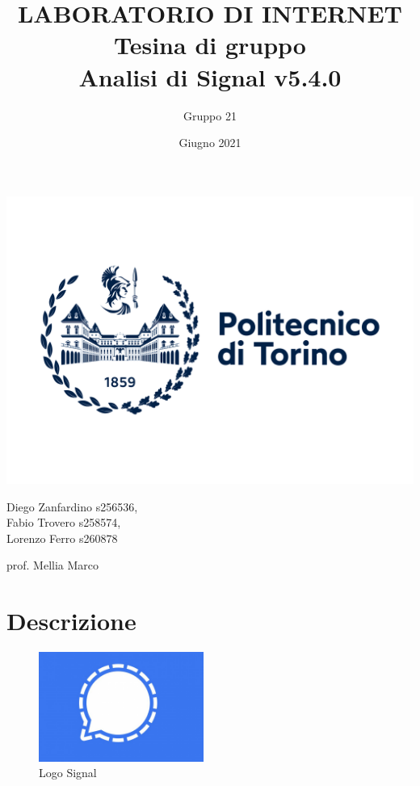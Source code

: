 \documentclass{article}
\title{\Huge LABORATORIO DI INTERNET 
    \\ Tesina di gruppo \\Analisi di Signal v5.4.0}
\author{Gruppo 21}
\date{Giugno 2021}
\begin{document}
    \maketitle

    \begin{center}
        \includegraphics[scale=0.1]{polito_logo_2021_blu.jpg}

        \vspace{20mm}

        Diego Zanfardino s256536, \\
        Fabio Trovero s258574, \\
        Lorenzo Ferro s260878

        \vspace{10mm}
        prof. Mellia Marco
    \end{center}

    \pagebreak


    \section{Descrizione}
    
    \begin{figure}
        \begin{center}
            \vspace{-20pt}
          \includegraphics[width=0.48\textwidth]{signal.jpg}
        \end{center}
        \vspace{-15pt}
        \caption{Logo Signal}
        \vspace{-10pt}
      \end{figure}
      
\end{document}
